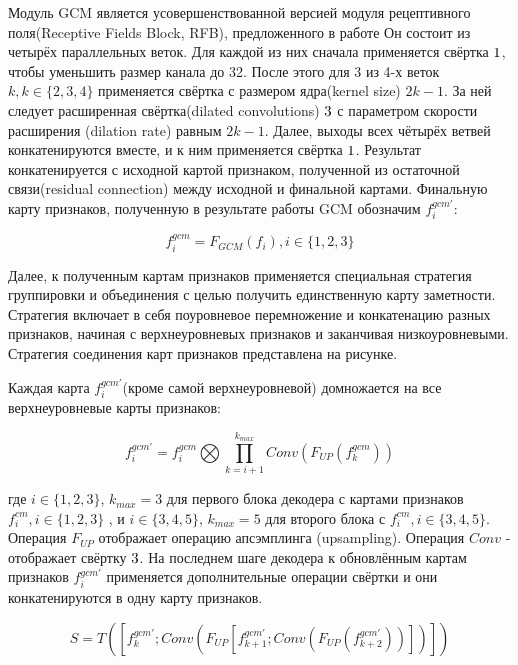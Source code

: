 Модуль GCM является усовершенствованной версией модуля рецептивного поля(Receptive Fields Block, RFB), предложенного в работе \cite{RFB}
Он состоит из четырёх параллельных веток. Для каждой из них сначала применяется свёртка $1 \time 1$, чтобы уменьшить размер 
канала до 32. После этого для 3 из 4-х веток $k, k \in \{2,3,4\}$ применяется свёртка с размером ядра(kernel size) $2k-1$. За ней 
следует расширенная свёртка(dilated convolutions) $3 \time 3$ с параметром скорости расширения (dilation rate) равным $2k-1$.
Далее, выходы всех чётырёх ветвей конкатенируются вместе, и к ним применяется свёртка $1 \time 1$. 
Результат конкатенируется с исходной картой признаком, полученной из остаточной связи(residual connection) между исходной и финальной картами.
Финальную карту признаков, полученную в результате работы GCM обозначим $f_i^{gcm'}$:

\begin{equation}
    f_i^{gcm} = F_{GCM}(f_i), i \in \{1,2,3\}
\end{equation}

Далее, к полученным картам признаков применяется специальная стратегия группировки и объединения с целью получить единственную
карту заметности. Стратегия включает в себя  поуровневое перемножение и конкатенацию разных признаков, начиная с верхнеуровневых признаков
и заканчивая низкоуровневыми. Стратегия соединения карт признаков представлена на рисунке.

Каждая карта $f_i^{gcm'}$(кроме самой верхнеуровневой) домножается на все верхнеуровневые карты признаков:

\begin{equation}
    f_i^{gcm'} = f_i^{gcm} \bigotimes \prod_{k=i+1}^{k_{max}}Conv(F_{UP}(f_k^{gcm}))
\end{equation}

где $i \in \{1,2,3\}$, $k_{max}=3$ для первого блока декодера с картами признаков $f_i^{cm}, i \in \{1,2,3\}$ , и
$i \in \{3,4,5\}$, $k_{max}=5$ для второго блока с $f_i^{cm}, i \in \{3,4,5\}$. Операция $F_{UP}$ отображает
операцию апсэмплинга (upsampling). Операция $Conv$ - отображает свёртку $3 \time 3$.
На последнем шаге декодера к обновлённым картам признаков $f_i^{gcm'}$  применяется дополнительные операции свёртки и они конкатенируются
в одну карту признаков. 

\begin{equation}
    S = T([f_k^{gcm'}; Conv(F_{UP}[f_{k+1}^{gcm'}; Conv(F_{UP}(f_{k+2}^{gcm'}))])])
\end{equation}

